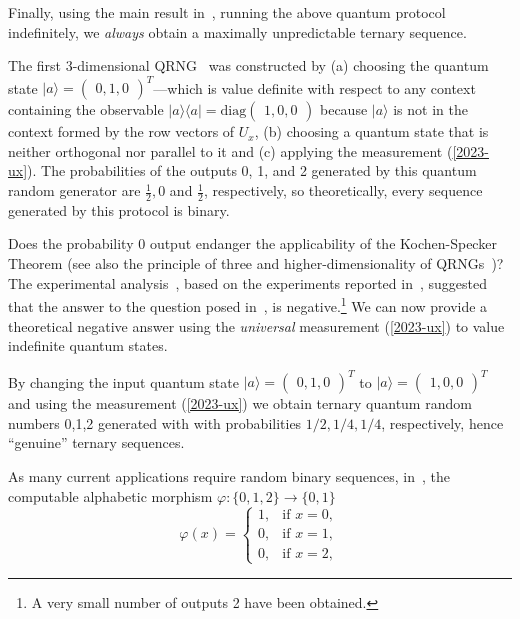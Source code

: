 \documentclass[%
 superscriptaddress,
  preprint,
 showpacs,
 showkeys,
 nofootinbib,
  amsmath,amssymb,
 pra,
  longbibliography,
  floatfix,
 ]{revtex4-2}
\theoremstyle{definition}
\begin{document}
Finally, using the main result in~\cite{acs-2015-info6040773}, running the above quantum protocol indefinitely, we {\it always} obtain a maximally unpredictable ternary sequence.


The first 3-dimensional QRNG~\cite{2012-incomput-proofsCJ} was constructed by (a)
choosing the quantum state $\vert a \rangle=\begin{pmatrix}0,1,0
\end{pmatrix}^T$---which is value definite with respect to any context containing the observable $\vert a \rangle \langle a\vert = \text{diag}\begin{pmatrix}1,0,0
\end{pmatrix}$ because $\vert a \rangle$ is not in the context formed by the row vectors of $U_{x}$, (b)  choosing a quantum state that is neither orthogonal nor parallel to
it and (c)  applying the measurement (\ref{2023-ux}).  The probabilities of the outputs 0, 1, and 2 generated by this quantum random generator are $\frac{1}{2},0  $  and $\frac{1}{2}$,  respectively, so theoretically, every sequence generated by this protocol is binary.

 Does the probability 0 output
 endanger the applicability of the Kochen-Specker Theorem (see also the
 principle of three and higher-dimensionality of QRNGs~\cite{svozil-2009-howto})? The experimental analysis~\cite{Abbott_2019}, based on the experiments reported in~\cite{Kulikov2017Dec}, suggested that the answer to the question posed in~\cite{Arkady_Fedorov-pc},  is negative.\footnote{A very small number of outputs 2 have been obtained.} We can now provide a theoretical negative answer using the {\it universal} measurement (\ref{2023-ux}) to value indefinite quantum states.






By  changing the input quantum state $\vert a \rangle = \begin{pmatrix} 0, 1 , 0  \end{pmatrix}^T$
  to $\vert a \rangle = \begin{pmatrix} 1 , 0 , 0 \end{pmatrix}^T$ and using the  measurement (\ref{2023-ux})
 we obtain ternary quantum random numbers 0,1,2 generated with with probabilities $1/2,1/4,1/4$, respectively,  hence
  ``genuine'' ternary sequences.

 As many current applications require random binary sequences, in~\cite{RSPA23},
 the computable  alphabetic morphism $\varphi \colon \{0,1,2\} \rightarrow \{0,1\}$
 \begin{equation}
 \varphi(x)=
 \begin{cases}1,&\text{if }x=0,
 \\0,&\text{if }x=1,
 \\0, &\text{if } x=2,\end{cases}
\label{2023-alphabeticmorphism}
 \end{equation}
\end{document}

